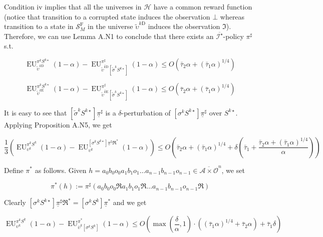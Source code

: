 \documentclass[a4paper]{article}
\newcommand{\Comment}[1]{}
\newcommand{\AP}[1]{\left(#1\right)}
\newcommand{\AB}[1]{\left[#1\right]}
\newcommand{\Ob}{\mathcal{O}}
\newcommand{\A}{\mathcal{A}}
\newcommand{\St}{\mathcal{S}}
\newcommand{\In}{\mathcal{I}}
\newcommand{\Hy}{\mathcal{H}}
\newcommand{\RMD}{\mathrm{D}}
\newcommand{\RME}{\mathrm{E}}
\newcommand{\RMF}{\mathrm{F}}
\newcommand{\SF}{\St^{\RMF}}
\newcommand{\EU}{\operatorname{EU}}
\begin{document}
Condition iv implies that all the universes in $\Hy$ have a common reward function (notice that transition to a corrupted state induces the observation $\bot$ whereas transition to a state in $\SF_M$ in the universe $\tilde{\upsilon}^{k\RMD}$ induces the observation $\Im$). Therefore, we can use Lemma A.N1 to conclude that there exists an $\overline{\In^\star}$-policy $\pi^\sharp$ s.t.

$$\EU_{\tilde{\upsilon}^{k\RMD}}^{\pi^kS^{k\star}}(1-\alpha) - \EU_{\overline{\tilde{\upsilon}^{k\RMD}}\AB{\tilde{\sigma}^k S^{k\star}}}^{\pi^\sharp}(1-\alpha) \leq O\AP{\bar{\tau}_2 \alpha + (\bar{\tau}_1 \alpha)^{1/4}}$$

$$\EU_{\tilde{\upsilon}^{k\RME}}^{\pi^kS^{k\star}}(1-\alpha) - \EU_{\overline{\tilde{\upsilon}^{k\RME}}\AB{\tilde{\sigma}^k S^{k\star}}}^{\pi^\sharp}(1-\alpha) \leq O\AP{\bar{\tau}_2 \alpha + (\bar{\tau}_1 \alpha)^{1/4}}$$

It is easy to see that $\AB{\tilde{\sigma}^k S^{k\star}}\underline{\pi}^\sharp$ is a $\delta$-perturbation of $\AB{\sigma^k S^{k\star}}\underline{\pi}^\sharp$ over $S^{k\star}$. Applying Proposition A.N5, we get

$$\frac{1}{3}\AP{\EU_{\upsilon^k}^{\pi^k S^{k}}(1-\alpha)-\EU_{\upsilon^k}^{\AB{\sigma^k S^{k\star}}\underline{\pi}^\sharp\Re^*}(1-\alpha)} \leq O\AP{\bar{\tau}_2 \alpha + (\bar{\tau}_1 \alpha)^{1/4} + \delta\AP{\bar{\tau}_1+\frac{\bar{\tau}_2 \alpha + (\bar{\tau}_1 \alpha)^{1/4}}{\alpha}}}$$

\Comment{Given $h = a_0 b_0 o_0 a_1 b_1 o_1 \ldots a_{n-1} b_{n-1} o_{n-1} \in \overline{\A \times \Ob}^n$, we use the notation 

$$\bar{\Re}^*h := a_0 b_0 o_0 \Re a_1 b_1 o_1 \Re \ldots a_{n-1} b_{n-1} o_{n-1} \Re \in \overline{\A \times \Ob'}^n$$

We define $\pi^*$ as by $\pi^*(h) := \pi^\star\AP{\bar{\Re}^*h}$.}

Define $\pi^*$ as follows. Given $h = a_0 b_0 o_0 a_1 b_1 o_1 \ldots a_{n-1} b_{n-1} o_{n-1} \in \overline{\A \times \Ob}^n$, we set

$$\pi^*(h) := \pi^\sharp\AP{a_0 b_0 o_0 \Re a_1 b_1 o_1 \Re \ldots a_{n-1} b_{n-1} o_{n-1} \Re}$$

Clearly $\AB{\sigma^k S^{k\star}}\underline{\pi}^\sharp\Re^* = \AB{\sigma^k S^{k}}\underline{\pi}^*$ and we get

$$\EU_{\upsilon^k}^{\pi^k S^{k}}(1-\alpha)-\EU_{\bar{\upsilon}^k\AB{\sigma^k S^{k}}}^{\pi^*}(1-\alpha) \leq O\AP{\max\AP{\frac{\delta}{\alpha},1}\cdot\AP{(\bar{\tau}_1 \alpha)^{1/4} + \bar{\tau}_2 \alpha}+\bar{\tau}_1\delta}$$
\end{document}
